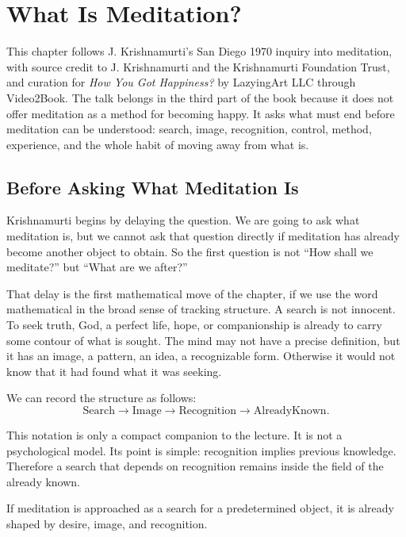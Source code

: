 \chapter{What Is Meditation?}

This chapter follows J. Krishnamurti's San Diego 1970 inquiry into meditation, with source credit to J. Krishnamurti and the Krishnamurti Foundation Trust, and curation for \emph{How You Got Happiness?} by LazyingArt LLC through Video2Book. The talk belongs in the third part of the book because it does not offer meditation as a method for becoming happy. It asks what must end before meditation can be understood: search, image, recognition, control, method, experience, and the whole habit of moving away from what is.

\section{Before Asking What Meditation Is}

Krishnamurti begins by delaying the question. We are going to ask what meditation is, but we cannot ask that question directly if meditation has already become another object to obtain. So the first question is not ``How shall we meditate?'' but ``What are we after?''

That delay is the first mathematical move of the chapter, if we use the word mathematical in the broad sense of tracking structure. A search is not innocent. To seek truth, God, a perfect life, hope, or companionship is already to carry some contour of what is sought. The mind may not have a precise definition, but it has an image, a pattern, an idea, a recognizable form. Otherwise it would not know that it had found what it was seeking.

We can record the structure as follows:
\begin{equation}
\mathrm{Search}
\longrightarrow
\mathrm{Image}
\longrightarrow
\mathrm{Recognition}
\longrightarrow
\mathrm{AlreadyKnown}.
\end{equation}

This notation is only a compact companion to the lecture. It is not a psychological model. Its point is simple: recognition implies previous knowledge. Therefore a search that depends on recognition remains inside the field of the already known.

\begin{proposition}
If meditation is approached as a search for a predetermined object, it is already shaped by desire, image, and recognition.
\end{proposition}

